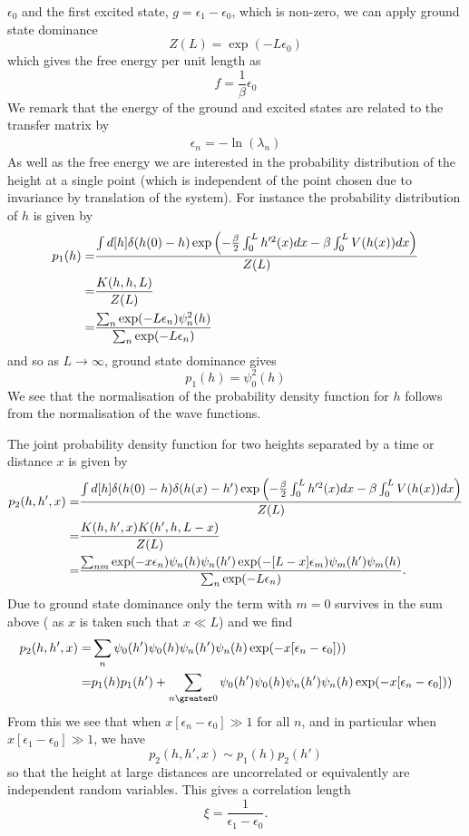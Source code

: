 $\epsilon_0$ and the first excited state, $g=\epsilon_1-\epsilon_0$, which is non-zero, we can apply ground state dominance 
\begin{equation}
    Z(L) =\exp(-L\epsilon_0)
\end{equation}
which gives the free energy per unit length as
\begin{equation}
    f=\frac{1}{\beta}\epsilon_0
\end{equation}
{\color{red} We remark that the energy of the ground and excited states are related to the transfer matrix by
\begin{align}
    \epsilon_n  = - \ln(\lambda_n)
\end{align}}
As well as the free energy we are interested in the probability distribution of the height at a single point (which is independent of the point chosen due to invariance by translation of the system). For instance the probability distribution of $h$ is given by
\begin{align}
p_1(h)=& \frac{\int d[h]\delta(h(0)-h)\exp\left(-\frac{\beta}{2}\int_0^L h'^2(x) dx -\beta\int_0^L  V(h(x)) dx\right)}{Z(L)}\nonumber \\
=& \frac{K(h,h,L)}{Z(L)} \nonumber \\
=& \frac{\sum_n \exp(-L\epsilon_n)\psi_n^2(h)}{\sum_n \exp(-L\epsilon_n)}
\end{align}
and so as $L\to\infty$, ground state dominance gives
\begin{equation}
    p_1(h)= \psi_0^2(h)
\end{equation}
We see that the normalisation of the probability density function for $h$ follows from the 
normalisation of the wave functions.

The joint probability density function for two heights separated by a time or distance $x$ is given by
\begin{align}
p_2(h,h',x)=& \frac{\int d[h]\delta(h(0)-h)\delta(h(x)-h')\exp\left(-\frac{\beta}{2}\int_0^L h'^2(x) dx -\beta\int_0^L  V(h(x)) dx\right)}{Z(L)}\nonumber \\
=& \frac{K(h,h',x)K(h',h,L-x)}{Z(L)} \nonumber \\
=& \frac{\sum_{nm} \exp(-x\epsilon_n)\psi_n(h)\psi_n(h')\exp(-[L-x]\epsilon_m)\psi_m(h')\psi_m(h)}{\sum_n \exp(-L\epsilon_n)}.
\end{align}
Due to ground state dominance only the term with $m=0$ survives in the sum above (
as $x$ is taken such that $x\ll L$) and we find
\begin{align}
p_2(h,h',x) =& \sum_{n} \psi_0(h')\psi_0(h)\psi_n(h')\psi_n(h)\exp(-x[\epsilon_n-\epsilon_0]))\nn
=& p_1(h)p_1(h') + \sum_{n\greater0} \psi_0(h')\psi_0(h)\psi_n(h')\psi_n(h)\exp(-x[\epsilon_n-\epsilon_0]))
\end{align}
From this we see that when $x[\epsilon_n-\epsilon_0] \gg1 $ for all $n$, and in particular when $x[\epsilon_1-\epsilon_0] \gg1$, we have 
\begin{equation}
    p_2(h,h',x) \sim p_1(h)p_2(h')
\end{equation}
so that the height at large distances are uncorrelated or equivalently are independent random variables. This gives a correlation length
\begin{equation}
    \xi = \frac{1}{\epsilon_1-\epsilon_0}.\label{clq}
\end{equation}

